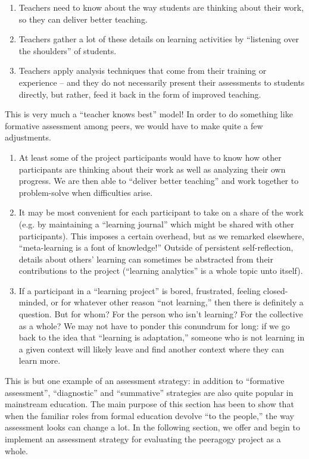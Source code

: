 \begin{enumerate}
\item
  Teachers need to know about the way students are thinking about their
  work, so they can deliver better teaching.
\item
  Teachers gather a lot of these details on learning activities by
  ``listening over the shoulders'' of students.
\item
  Teachers apply analysis techniques that come from their training or
  experience -- and they do not necessarily present their assessments to
  students directly, but rather, feed it back in the form of improved
  teaching.
\end{enumerate}
This is very much a ``teacher knows best'' model! In order to do
something like formative assessment among peers, we would have to make
quite a few adjustments.

\begin{enumerate}
\item
  At least some of the project participants would have to know how other
  participants are thinking about their work as well as analyzing their
  own progress. We are then able to ``deliver better teaching'' and work
  together to problem-solve when difficulties arise.
\item
  It may be most convenient for each participant to take on a share of
  the work (e.g. by maintaining a ``learning journal'' which might be
  shared with other participants). This imposes a certain overhead, but
  as we remarked elsewhere, ``meta-learning is a font of knowledge!''
  Outside of persistent self-reflection, details about others' learning
  can sometimes be abstracted from their contributions to the project
  (``learning analytics'' is a whole topic unto itself).
\item
  If a participant in a ``learning project'' is bored, frustrated,
  feeling closed-minded, or for whatever other reason ``not learning,''
  then there is definitely a question. But for whom? For the person who
  isn't learning? For the collective as a whole? We may not have to
  ponder this conundrum for long: if we go back to the idea that
  ``learning is adaptation,'' someone who is not learning in a given
  context will likely leave and find another context where they can
  learn more.
\end{enumerate}
This is but one example of an assessment strategy: in addition to
``formative assessment'', ``diagnostic'' and ``summative'' strategies
are also quite popular in mainstream education. The main purpose of this
section has been to show that when the familiar roles from formal
education devolve ``to the people,'' the way assessment looks can change
a lot. In the following section, we offer and begin to implement an
assessment strategy for evaluating the peeragogy project as a whole.

